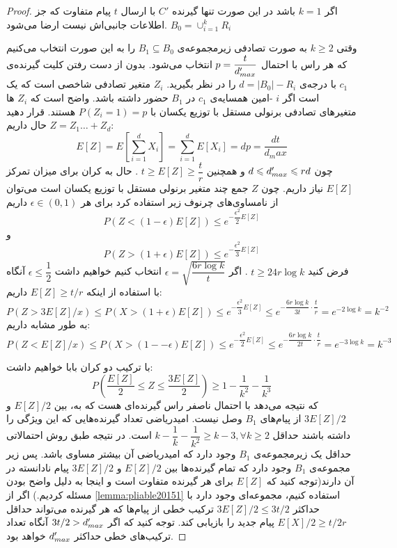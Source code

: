 \begin{proof}
	اگر
	$k = 1$
	باشد در این صورت تنها گیرنده
	$C'$
	با ارسال
	$t$
	پیام متفاوت که جز اطلاعات جانبی‌اش نیست ارضا می‌شود.
	$B_0 = \cup_{i = 1}^{k} R_i$
	
	وقتی
	$k \geq 2$
	به صورت تصادفی زیرمجموعه‌ی
	$B_1 \subseteq B_0$
	را به این صورت انتخاب می‌کنیم که هر راس با احتمال
	$p = \dfrac{t}{d_{max}'}$
	انتخاب می‌شود. بدون از دست رفتن کلیت گیرنده‌ی
	$c_1$
	با درجه‌ی
	$d = |B_0| - R_i$
	را در نظر بگیرید.
	$Z_i$
	متغیر تصادفی شاخصی است که یک است اگر
	$i$
	-امین همسایه‌ی
	$c_1$
	در
	$B_1$
	حضور داشته باشد. واضح است که
	$Z_i$
	ها متغیرهای تصادفی برنولی مستقل با توزیع یکسان با
	$P(Z_i = 1) = p$
	هستند. قرار دهید
	$Z = Z_1 \ldots + Z_d$
	حال داریم:
	\begin{equation}
		E[Z] = E[\sum\limits_{i = 1}^{d} X_i ] = \sum\limits_{i = 1}^{d} E[X_i] = dp = \dfrac{dt}{d_max}
	\end{equation}
	چون
	$d \leqslant d_{max}' \leqslant rd$
	و همچنین
	$t \geq E[Z] \geq \dfrac{t}{r}$
	. حال به کران برای میزان تمرکز
	$E[Z]$
	نیاز داریم. چون
	$Z$
	جمع چند متغیر برنولی مستقل با توزیع یکسان است می‌توان از نامساوی‌های چرنوف زیر استفاده کرد
	\cite{Dubhashi_Panconesi_2009}
	برای هر
	$\epsilon \in (0, 1)$
	داریم
	$$P(Z < (1 - \epsilon) E[Z]) \leq e^{- \dfrac{\epsilon^2}{2} E[Z]}$$
	و
	$$P(Z > (1 + \epsilon) E[Z]) \leq e^{- \dfrac{\epsilon^2}{3} E[Z]}$$
	فرض کنید
	$t \geq 24 r \log k$
	. اگر
	$\epsilon = \sqrt{\dfrac{6r \log k}{t}}$
	انتخاب کنیم خواهیم داشت
	$\epsilon \leq \dfrac{1}{2}$
	آنگاه با استفاده از اینکه
	$E[Z] \geq t/r$
	داریم:
	\begin{equation}
		P(Z > 3 E[Z]/x) \leq P(X > (1 + \epsilon) E[Z]) \leq e^{-\dfrac{\epsilon^2}{3} E[Z]} \leq e^{- \dfrac{6 r \log k}{3 t} \cdot \dfrac{t}{r}} = e^{- 2 \log k} = k^{-2}
	\end{equation}
	به طور مشابه داریم:
	\begin{equation}
		P(Z < E[Z]/x) \leq P(X > (1 -- \epsilon) E[Z]) \leq e^{-\dfrac{\epsilon^2}{2} E[Z]} \leq e^{- \dfrac{6 r \log k}{2 t} \cdot \dfrac{t}{r}} = e^{-3 \log k} = k^{-3}
	\end{equation}
	
	با ترکیب دو کران بابا خواهیم داشت:
	\begin{equation}
		P(\dfrac{E[Z]}{2} \leq Z \leq \dfrac{3E[Z]}{2}) \geq 1 - \dfrac{1}{k^2} - \dfrac{1}{k^3}
	\end{equation}
	که نتیجه می‌دهد با احتمال ناصفر راس گیرنده‌ای هست که به، بین
	$E[Z]/2$
	و
	$3E[Z]/2$
	از پیام‌های
	$B_1$
	وصل نیست. امیدریاضی تعداد گیرنده‌هایی که این ویژگی را داشته باشند حداقل
	$k - \dfrac{1}{k} - \dfrac{1}{k^2} \geq k - 3, \forall k \geq 2$
	است. در نتیجه طبق روش احتمالاتی حداقل یک زیرمجموعه‌ی
	$B_1$
	وجود دارد که امیدریاضی آن بیشتر مساوی باشد. پس زیر مجموعه‌ی
	$B_1$
	وجود دارد که تمام گیرنده‌ها بین
	$E[Z] / 2$
	و
	$3E[Z]/2$
	پیام نادانسته در آن دارند(توجه کنید که
	$E[Z]$
	برای هر گیرنده متفاوت است و اینجا به دلیل واضح بودن مسئله 
	کردیم.) اگر از 
	\autoref{lemma:pliable20151}
	استفاده کنیم، مجموعه‌ای وجود دارد با حداکثر
	$3E[Z]/2 \leq 3t/2$
	ترکیب خطی از پیام‌ها که هر گیرنده می‌تواند حداقل
	$E[X]/2 \geq t/2r$
	پیام جدید را بازیابی کند. توجه کنید که اگر
	$3t/2 > d_{max}'$
	آنگاه تعداد ترکیب‌های خطی حداکثر
	$d_{max}'$
	خواهد بود.
	

\end{proof}
